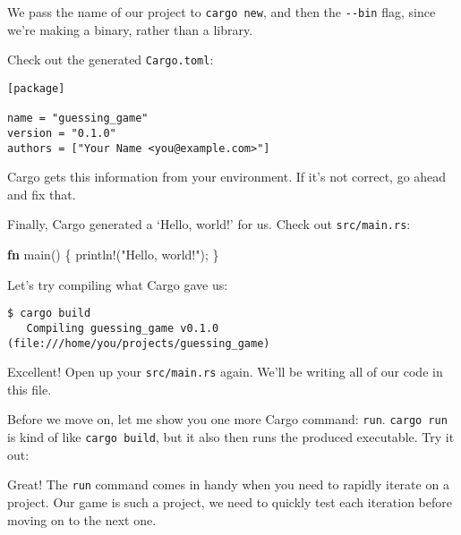 \documentclass[a4paper,]{book}
\newenvironment{Shaded}{\begin{snugshade}}{\end{snugshade}}
\newcommand{\KeywordTok}[1]{\textcolor[rgb]{0.13,0.29,0.53}{\textbf{{#1}}}}
\newcommand{\StringTok}[1]{\textcolor[rgb]{0.31,0.60,0.02}{{#1}}}
\newcommand{\OtherTok}[1]{\textcolor[rgb]{0.56,0.35,0.01}{{#1}}}
\newcommand{\NormalTok}[1]{{#1}}
\begin{document}
We pass the name of our project to \texttt{cargo\ new}, and then the
\texttt{-\/-bin} flag, since we're making a binary, rather than a
library.

Check out the generated \texttt{Cargo.toml}:

\begin{verbatim}
[package]

name = "guessing_game"
version = "0.1.0"
authors = ["Your Name <you@example.com>"]
\end{verbatim}

Cargo gets this information from your environment. If it's not correct,
go ahead and fix that.

Finally, Cargo generated a `Hello, world!' for us. Check out
\texttt{src/main.rs}:

\begin{Shaded}
\begin{Highlighting}[]
\KeywordTok{fn} \NormalTok{main() \{}
    \OtherTok{println!}\NormalTok{(}\StringTok{"Hello, world!"}\NormalTok{);}
\NormalTok{\}}
\end{Highlighting}
\end{Shaded}

Let's try compiling what Cargo gave us:

\begin{verbatim}
$ cargo build
   Compiling guessing_game v0.1.0 (file:///home/you/projects/guessing_game)
\end{verbatim}

Excellent! Open up your \texttt{src/main.rs} again. We'll be writing all
of our code in this file.

Before we move on, let me show you one more Cargo command: \texttt{run}.
\texttt{cargo\ run} is kind of like \texttt{cargo\ build}, but it also
then runs the produced executable. Try it out:

\begin{Shaded}
\end{Shaded}

Great! The \texttt{run} command comes in handy when you need to rapidly
iterate on a project. Our game is such a project, we need to quickly
test each iteration before moving on to the next one.
\end{document}
